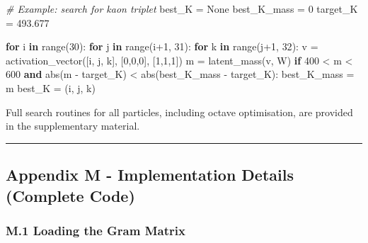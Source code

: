 \documentclass[11pt]{article}
\newenvironment{Shaded}{}{}
\newcommand{\BuiltInTok}[1]{\textcolor[rgb]{0.00,0.50,0.00}{#1}}
\newcommand{\CommentTok}[1]{\textcolor[rgb]{0.38,0.63,0.69}{\textit{#1}}}
\newcommand{\ControlFlowTok}[1]{\textcolor[rgb]{0.00,0.44,0.13}{\textbf{#1}}}
\newcommand{\DecValTok}[1]{\textcolor[rgb]{0.25,0.63,0.44}{#1}}
\newcommand{\FloatTok}[1]{\textcolor[rgb]{0.25,0.63,0.44}{#1}}
\newcommand{\KeywordTok}[1]{\textcolor[rgb]{0.00,0.44,0.13}{\textbf{#1}}}
\newcommand{\NormalTok}[1]{#1}
\newcommand{\OperatorTok}[1]{\textcolor[rgb]{0.40,0.40,0.40}{#1}}
\newcommand{\VariableTok}[1]{\textcolor[rgb]{0.10,0.09,0.49}{#1}}
\begin{document}
\begin{Shaded}
\begin{Highlighting}[]
\CommentTok{\# Example: search for kaon triplet}
\NormalTok{best\_K }\OperatorTok{=} \VariableTok{None}
\NormalTok{best\_K\_mass }\OperatorTok{=} \DecValTok{0}
\NormalTok{target\_K }\OperatorTok{=} \FloatTok{493.677}

\ControlFlowTok{for}\NormalTok{ i }\KeywordTok{in} \BuiltInTok{range}\NormalTok{(}\DecValTok{30}\NormalTok{):}
    \ControlFlowTok{for}\NormalTok{ j }\KeywordTok{in} \BuiltInTok{range}\NormalTok{(i}\OperatorTok{+}\DecValTok{1}\NormalTok{, }\DecValTok{31}\NormalTok{):}
        \ControlFlowTok{for}\NormalTok{ k }\KeywordTok{in} \BuiltInTok{range}\NormalTok{(j}\OperatorTok{+}\DecValTok{1}\NormalTok{, }\DecValTok{32}\NormalTok{):}
\NormalTok{            v }\OperatorTok{=}\NormalTok{ activation\_vector([i, j, k], [}\DecValTok{0}\NormalTok{,}\DecValTok{0}\NormalTok{,}\DecValTok{0}\NormalTok{], [}\DecValTok{1}\NormalTok{,}\DecValTok{1}\NormalTok{,}\DecValTok{1}\NormalTok{])}
\NormalTok{            m }\OperatorTok{=}\NormalTok{ latent\_mass(v, W)}
            \ControlFlowTok{if} \DecValTok{400} \OperatorTok{\textless{}}\NormalTok{ m }\OperatorTok{\textless{}} \DecValTok{600} \KeywordTok{and} \BuiltInTok{abs}\NormalTok{(m }\OperatorTok{{-}}\NormalTok{ target\_K) }\OperatorTok{\textless{}} \BuiltInTok{abs}\NormalTok{(best\_K\_mass }\OperatorTok{{-}}\NormalTok{ target\_K):}
\NormalTok{                best\_K\_mass }\OperatorTok{=}\NormalTok{ m}
\NormalTok{                best\_K }\OperatorTok{=}\NormalTok{ (i, j, k)}
\end{Highlighting}
\end{Shaded}

Full search routines for all particles, including octave optimisation,
are provided in the supplementary material.

\begin{center}\rule{0.5\linewidth}{0.5pt}\end{center}

\hypertarget{appendix-m---implementation-details-complete-code}{%
\subsection{Appendix M - Implementation Details (Complete
Code)}\label{appendix-m---implementation-details-complete-code}}

\label{app:implementation}

\hypertarget{m.1-loading-the-gram-matrix}{%
\subsubsection{M.1 Loading the Gram
Matrix}\label{m.1-loading-the-gram-matrix}}
\end{document}
